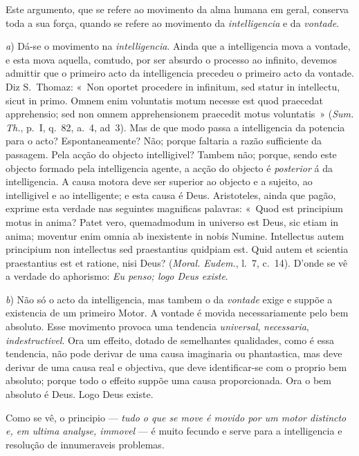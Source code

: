 {Este argumento, que se refere ao movimento da alma humana em geral, conserva toda a sua
força, quando se refere ao movimento da \emph{intelligencia} e da \emph{vontade}.

\emph{a}) Dá-se o movimento na \emph{intelligencia}. Ainda que a intelligencia mova a
vontade, e esta mova aquella, comtudo, por ser absurdo o processo ao infinito, devemos
admittir que o primeiro acto da intelligencia precedeu o primeiro acto da vontade. Diz
S.~Thomaz: «~Non oportet procedere in infinitum, sed statur in intellectu, sicut in
primo. Omnem enim voluntatis motum necesse est quod praecedat apprehensio; sed non
omnem apprehensionem praecedit motus voluntatis~» (\emph{Sum. Th.}, p.~I, q.~82, a.~4,
ad~3). Mas de que modo passa a intelligencia da potencia para o acto? Espontaneamente?
Não; porque faltaria a razão sufficiente da passagem. Pela acção do objecto
intelligivel? Tambem não; porque, sendo este objecto formado pela intelligencia agente,
a acção do objecto é \emph{posterior} á da intelligencia. A causa motora deve ser
superior ao objecto e a sujeito, ao intelligivel e ao intelligente; e esta causa é Deus.
Aristoteles, ainda que pagão, exprime esta verdade nas seguintes magnificas palavras:
«~Quod est principium motus in anima? Patet vero, quemadmodum in universo est Deus, sic
etiam in anima; moventur enim omnia ab inexistente in nobis Numine. Intellectus autem
principium non intellectus sed praestantius quidpiam est. Quid autem et scientia
praestantius est et ratione, nisi Deus? (\emph{Moral. Eudem.}, l.~7, c.~14). D'onde se
vê a verdade do aphorismo: \emph{Eu penso; logo Deus existe}.

\emph{b}) Não só o acto da intelligencia, mas tambem o da \emph{vontade} exige e suppõe
a existencia de um primeiro Motor. A vontade é movida necessariamente pelo bem absoluto.
Esse movimento provoca uma tendencia \emph{universal}, \emph{necessaria},
\emph{indestructivel}. Ora um effeito, dotado de semelhantes qualidades, como é essa
tendencia, não pode derivar de uma causa imaginaria ou phantastica, mas deve derivar de
uma causa real e objectiva, que deve
identificar-se com o proprio bem absoluto; porque todo o effeito suppõe uma causa
proporcionada. Ora o bem absoluto é Deus. Logo Deus existe.

Como se vê, o principio --- \emph{tudo o que se move é movido por um motor distincto e,
em ultima analyse, immovel} --- é muito fecundo e serve para a intelligencia e resolução
de innumeraveis problemas.}

